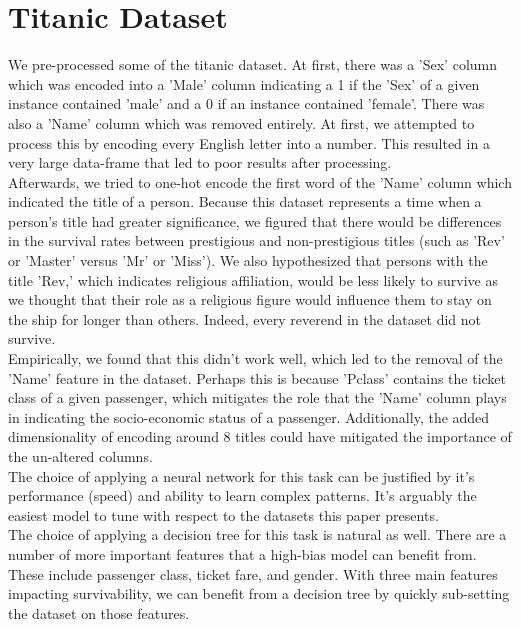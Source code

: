 \documentclass{article}
\begin{document}
\newpage
\section*{Titanic Dataset}
We pre-processed some of the titanic dataset. At first, there was a 'Sex' column which was encoded into a 'Male' column indicating a 1 if the 'Sex' of a given instance contained 'male' and a 0 if an instance contained 'female'.
There was also a 'Name' column which was removed entirely. At first, we attempted to process this by encoding every English letter into a number. This resulted in a very large data-frame that led to poor results after processing. 
\\

Afterwards, we tried to one-hot encode the first word of the 'Name' column which indicated the title of a person. Because this dataset represents a time when a person's title had greater significance, we figured that there would be differences in the survival rates between prestigious and non-prestigious titles (such as 'Rev' or 'Master' versus 'Mr' or 'Miss').
We also hypothesized that persons with the title 'Rev,' which indicates religious affiliation, would be less likely to survive as we thought that their role as a religious figure would influence them to stay on the ship for longer than others. Indeed, every reverend in the dataset did not survive.
\\

Empirically, we found that this didn't work well, which led to the removal of the 'Name' feature in the dataset.
Perhaps this is because 'Pclass' contains the ticket class of a given passenger, which mitigates the role that the 'Name' column plays in indicating the socio-economic status of a passenger. Additionally,
the added dimensionality of encoding around 8 titles could have mitigated the importance of the un-altered columns.
\\

The choice of applying a neural network for this task can be justified by it's performance (speed) and ability to learn complex patterns. 
It's arguably the easiest model to tune with respect to the datasets this paper presents.
\\

The choice of applying a decision tree for this task is natural as well. There are a number of more important features that a high-bias model can benefit from. These
include passenger class, ticket fare, and gender. With three main features impacting survivability, we can benefit from a decision tree by quickly sub-setting the dataset on those features.
\end{document}
